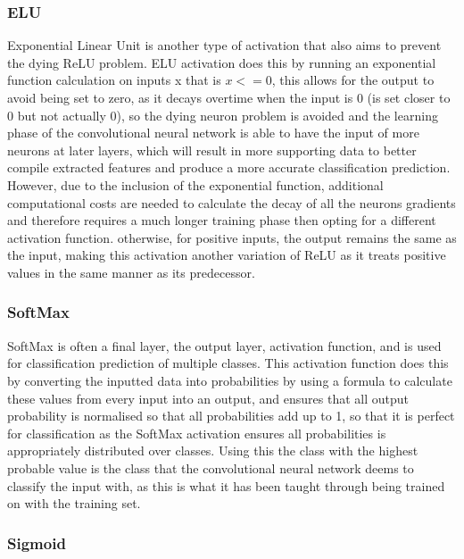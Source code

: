 \documentclass[]{final_report}
\begin{document}
\subsubsection{ELU}

Exponential Linear Unit is another type of activation that also aims to prevent the dying ReLU problem. ELU activation does this by running an exponential function calculation on inputs x that is $x<=0$, this allows for the output to avoid being set to zero, as it decays overtime when the input is 0 (is set closer to 0 but not actually 0), so the dying neuron problem is avoided and the learning phase of the convolutional neural network is able to have the input of more neurons at later layers, which will result in more supporting data to better compile extracted features and produce a more accurate classification prediction. However, due to the inclusion of the exponential function, additional computational costs are needed to calculate the decay of all the neurons gradients and therefore requires a much longer training phase then opting for a different activation function. otherwise, for positive inputs, the output remains the same as the input, making this activation another variation of ReLU as it treats positive values in the same manner as its predecessor.

\subsubsection{SoftMax}

SoftMax is often a final layer, the output layer, activation function, and is used for classification prediction of multiple classes. This activation function does this by converting the inputted data into probabilities by using a formula to calculate these values from every input into an output, and ensures that all output probability is normalised so that all probabilities add up to 1, so that it is perfect for classification as the SoftMax activation ensures all probabilities is appropriately distributed over classes. Using this the class with the highest probable value is the class that the convolutional neural network deems to classify the input with, as this is what it has been taught through being trained on with the training set.

\subsubsection{Sigmoid}
\end{document}
